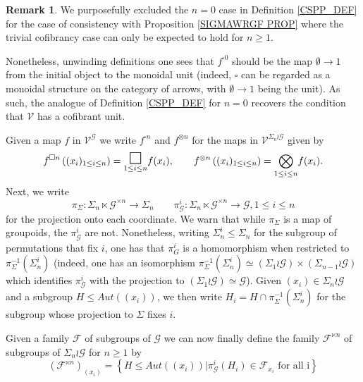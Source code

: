 \documentclass[a4paper,10pt
,draft
]{article}%
\numberwithin{equation}{section}
\numberwithin{figure}{section}
\theoremstyle{definition} %
\newtheorem{remark}[equation]{Remark}%
\newcommand{\F}{\ensuremath{\mathcal F}}
\newcommand{\V}{\ensuremath{\mathcal V}}
\newcommand{\G}{\ensuremath{\mathcal G}}
\newcommand{\1}{\ensuremath{\mathbbm 1}}%
\begin{document}
\begin{remark}
We purposefully excluded the $n=0$ case in Definition \ref{CSPP_DEF}
for the case of consistency with Proposition \ref{SIGMAWRGF PROP}
where the trivial cofibrancy case can only be expected to hold for $n\geq 1$.

Nonetheless, unwinding definitions one sees that
$f^{\square 0}$
should be the map 
$\emptyset \to 1$
from the initial object to the monoidal unit
(indeed, $\square$ can be regarded as a monoidal structure on the category of arrows, with $\emptyset \to 1$ being the unit).
As such, the analogue of Definition \ref{CSPP_DEF} for $n=0$ 
recovers the condition that $\V$ has a cofibrant unit.
\end{remark}


Given a map $f$ in $\mathcal{V}^{\G}$
we write 
$f^{\square n}$  and 
$f^{\otimes n}$
for the maps in $\mathcal{V}^{\Sigma_n \wr \G}$
given by
\begin{equation}\label{FSQNDEF EQ}
f^{\square n}\left((x_i)_{1\leq i \leq n }\right)
=
\underset{1\leq i \leq n}{\mathlarger{\mathlarger{\mathlarger{\square}}}} f(x_i),
\qquad
f^{\otimes n}\left((x_i)_{1\leq i \leq n }\right)
=
\underset{1\leq i \leq n}{\bigotimes} f(x_i).
\end{equation}
Next, we write
\[
\pi_{\Sigma} \colon \Sigma_n \ltimes \G^{\times n} \to \Sigma_n
\qquad
\pi^i_{\G} \colon \Sigma_n \ltimes \G^{\times n} \to \G, 1\leq i \leq n
\]
for the projection onto each coordinate.
We warn that while $\pi_{\Sigma}$ is a map of groupoids, 
the $\pi^i_{\G}$ are not.
Nonetheless, writing $\Sigma^i_n \leq \Sigma_n$
for the subgroup of permutations that fix $i$, 
one has that $\pi_{G}^i$ is a homomorphism when restricted to 
$\pi^{-1}_{\Sigma}(\Sigma_n^i)$ 
(indeed, one has an isomorphism 
$\pi^{-1}_{\Sigma}(\Sigma_n^i) \simeq 
(\Sigma_{1} \wr \G) \times (\Sigma_{n-1} \wr \G)$
which identifies $\pi_{\G}^i$ with the projection to 
$(\Sigma_{1} \wr \G) \simeq \G$).
Given $(x_i) \in \Sigma_n \wr \G$
and a subgroup
$H \leq Aut((x_i))$,
we then write
$H_i = H \cap \pi^{-1}_{\Sigma}(\Sigma_n^i)$
for the subgroup whose projection to $\Sigma$ fixes $i$.

Given a family $\F$ of subgroups of $\G$
we can now finally define the family $\F^{\ltimes n}$
of subgroups of $\Sigma_n \wr \G$ for $n\geq 1$ by
\begin{equation}\label{FWRNXI EQ}
\left(\F^{\ltimes n}\right)_{(x_i)}
=
\left\{
H \leq Aut((x_i))|
\pi^i_{\G}(H_i) \in \F_{x_i} \text{ for all i}
\right\}
\end{equation}
\end{document}
